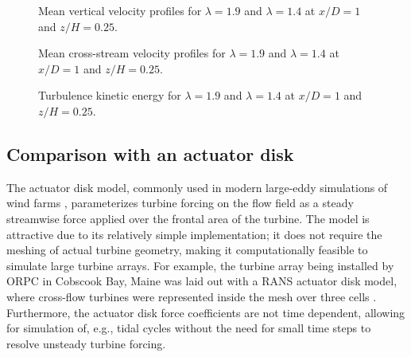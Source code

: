 \begin{figure}[t]

    \caption{Mean vertical velocity profiles for $\lambda = 1.9$ and
        $\lambda=1.4$ at $x/D=1$ and $z/H = 0.25$.}

    \label{fig:meanw_2tsrs} 
\end{figure}

\begin{figure}[t]

    \caption{Mean cross-stream velocity profiles for $\lambda = 1.9$ and
        $\lambda=1.4$ at $x/D=1$ and $z/H = 0.25$.}

    \label{fig:meanv_2tsrs} 
\end{figure}

\begin{figure}[t]

    \caption{Turbulence kinetic energy for $\lambda = 1.9$ and
        $\lambda=1.4$ at $x/D=1$ and $z/H = 0.25$.}

    \label{fig:RVAT-baseline-k-2tsrs} 
\end{figure}



\subsection{Comparison with an actuator disk}

The actuator disk model, commonly used in modern large-eddy simulations of wind
farms \cite{Stevens2014}, parameterizes turbine forcing on the flow field as a
steady streamwise force applied over the frontal area of the turbine. The model
is attractive due to its relatively simple implementation; it does not require
the meshing of actual turbine geometry, making it computationally feasible to
simulate large turbine arrays. For example, the turbine array being installed by
ORPC in Cobscook Bay, Maine was laid out with a RANS actuator disk model, where
cross-flow turbines were represented inside the mesh over three cells
\cite{Nelson2013}. Furthermore, the actuator disk force coefficients are not
time dependent, allowing for simulation of, e.g., tidal cycles without the need
for small time steps to resolve unsteady turbine forcing.

